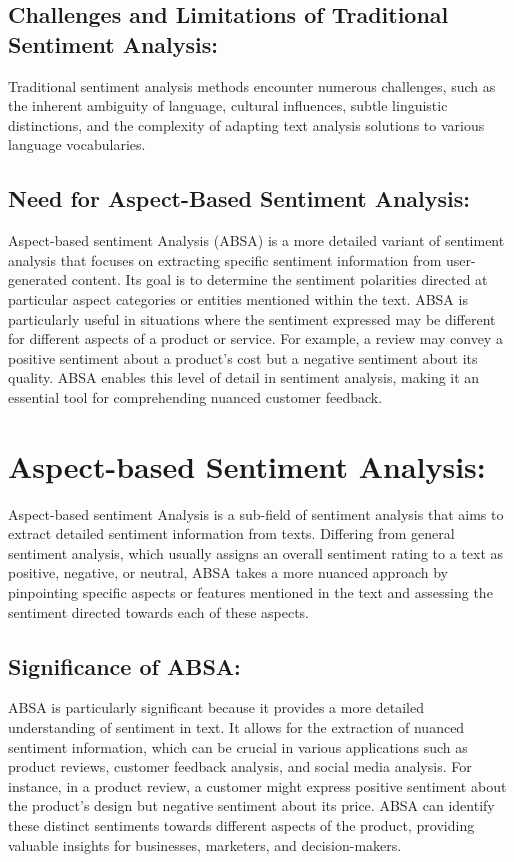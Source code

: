 \documentclass{article}
\begin{document}
\subsection{Challenges and Limitations of Traditional Sentiment Analysis: }    
Traditional sentiment analysis methods encounter numerous challenges, such as the inherent ambiguity of language, cultural influences, subtle linguistic distinctions, and the complexity of adapting text analysis solutions to various language vocabularies.\cite{doi:10.1504/IJESMS.2021.119892} 

\subsection{Need for Aspect-Based Sentiment Analysis:}
Aspect-based sentiment Analysis (ABSA) is a more detailed variant of sentiment analysis that focuses on extracting specific sentiment information from user-generated content. Its goal is to determine the sentiment polarities directed at particular aspect categories or entities mentioned within the text.\cite{Feng2022UnrestrictedAM} ABSA is particularly useful in situations where the sentiment expressed may be different for different aspects of a product or service. For example, a review may convey a positive sentiment about a product's cost but a negative sentiment about its quality. ABSA enables this level of detail in sentiment analysis, making it an essential tool for comprehending nuanced customer feedback.\cite{Feng2022UnrestrictedAM}

\section{Aspect-based Sentiment Analysis:}
Aspect-based sentiment Analysis is a sub-field of sentiment analysis that aims to extract detailed sentiment information from texts. Differing from general sentiment analysis, which usually assigns an overall sentiment rating to a text as positive, negative, or neutral, ABSA takes a more nuanced approach by pinpointing specific aspects or features mentioned in the text and assessing the sentiment directed towards each of these aspects.\cite{doi:10.1504/IJESMS.2021.119892} \cite{NazirIssues&Chall2023}

\subsection{Significance of ABSA:}
ABSA is particularly significant because it provides a more detailed understanding of sentiment in text. It allows for the extraction of nuanced sentiment information, which can be crucial in various applications such as product reviews, customer feedback analysis, and social media analysis. For instance, in a product review, a customer might express positive sentiment about the product's design but negative sentiment about its price. ABSA can identify these distinct sentiments towards different aspects of the product, providing valuable insights for businesses, marketers, and decision-makers. \cite{doi:10.1504/IJESMS.2021.119892}\cite{Jiang2023AspectBasedSA}
\end{document}
